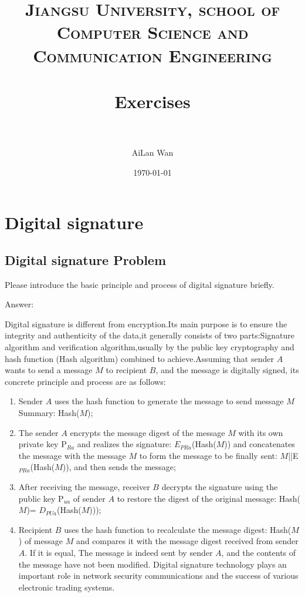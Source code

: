 \documentclass[paper=a4, fontsize=11pt]{scrartcl} %
\title{
\normalfont \normalsize
\textsc{Jiangsu University, school of Computer Science and Communication Engineering} \\ [25pt] %
\horrule{0.5pt} \\[0.4cm] %
\huge Exercises \\ %
\horrule{2pt} \\[0.5cm] %
}
\author{AiLan Wan} %
\date{\normalsize\today} %
\numberwithin{equation}{section} %
\numberwithin{figure}{section} %
\numberwithin{table}{section} %
\begin{document}
\maketitle %
\section{Digital signature}
\label{sec:ds}
\subsection{Digital signature Problem \uppercase\expandafter{}}

Please introduce the basic principle and process of digital signature briefly.

Answer:

Digital signature is different from encryption.Its main purpose is to ensure the integrity and authenticity of the data,it generally consists of two parts:Signature algorithm and verification algorithm,usually by the public key cryptography and hash function (Hash algorithm) combined to achieve.Assuming that sender $A$ wants to send a message $M$ to recipient $B$, and the message is digitally signed, its concrete principle and process are as follows:
\begin{enumerate}
\item Sender $A$ uses the hash function to generate the message to send message $M$ Summary: Hash($M$);
\item The sender $A$ encrypts the message digest of the message $M$ with its own private key P$_{Ra}$ and realizes the signature: $E$$_{PRa}$(Hash($M$)) and concatenates the message with the message $M$ to form the message to be finally sent: $M$||E$_{PRa}$(Hash($M$)), and then sends the message;
\item After receiving the message, receiver $B$ decrypts the signature using the public key P$_{ua}$ of sender $A$ to restore the digest of the original message: Hash($M$)= $D$$_{PUa}$(Hash($M$)));
\item Recipient $B$ uses the hash function to recalculate the message digest: Hash($M$) of message $M$ and compares it with the message digest received from sender $A$. If it is equal, The message is indeed sent by sender $A$, and the contents of the message have not been modified. Digital signature technology plays an important role in network security communications and the success of various electronic trading systems.
\end{enumerate}
\end{document}
